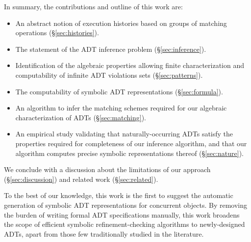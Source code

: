 In summary, the contributions and outline of this work are:
\begin{itemize}

  \item An abstract notion of execution histories based on groups of matching
  operations (§\ref{sec:histories}).

  \item The statement of the ADT inference problem (§\ref{sec:inference}).

  \item Identification of the algebraic properties allowing finite
  characterization and computability of infinite ADT violations sets
  (§\ref{sec:patterns}).

  \item The computability of symbolic ADT representations (§\ref{sec:formula}).

  \item An algorithm to infer the matching schemes required for our algebraic
  characterization of ADTs (§\ref{sec:matching}).

  \item An empirical study validating that naturally-occurring ADTs satisfy the
  properties required for completeness of our inference algorithm, and that our
  algorithm computes precise symbolic representations thereof
  (§\ref{sec:nature}).

\end{itemize}
We conclude with a discussion about the limitations of our approach
(§\ref{sec:discussion}) and related work (§\ref{sec:related}).

To the best of our knowledge, this work is the first to suggest the automatic
generation of symbolic ADT representations for concurrent objects. By removing
the burden of writing formal ADT specifications manually, this work broadens
the scope of efficient symbolic refinement-checking algorithms to
newly-designed ADTs, apart from those few traditionally studied in the
literature.
